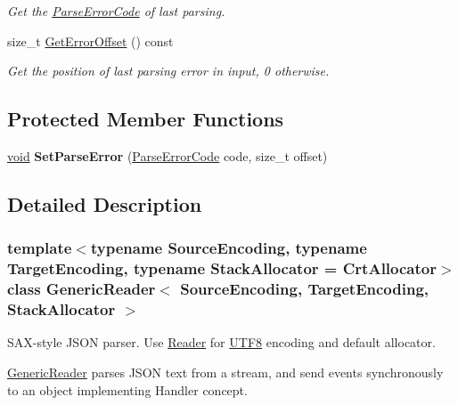 \begin{DoxyCompactItemize}
\begin{DoxyCompactList}\small\item\em Get the \hyperlink{group___r_a_p_i_d_j_s_o_n___e_r_r_o_r_s_ga8d4b32dfc45840bca189ade2bbcb6ba7}{Parse\+Error\+Code} of last parsing. \end{DoxyCompactList}\item 
\hypertarget{class_generic_reader_a77399ac40cca1fb113a2d507f476b4e7}{}size\+\_\+t \hyperlink{class_generic_reader_a77399ac40cca1fb113a2d507f476b4e7}{Get\+Error\+Offset} () const \label{class_generic_reader_a77399ac40cca1fb113a2d507f476b4e7}

\begin{DoxyCompactList}\small\item\em Get the position of last parsing error in input, 0 otherwise. \end{DoxyCompactList}\end{DoxyCompactItemize}
\subsection*{Protected Member Functions}
\begin{DoxyCompactItemize}
\item 
\hypertarget{class_generic_reader_ae50079444295bf109730c3b708a818a6}{}\hyperlink{_s_d_l__audio_8h_a52835ae37c4bb905b903cbaf5d04b05f}{void} {\bfseries Set\+Parse\+Error} (\hyperlink{group___r_a_p_i_d_j_s_o_n___e_r_r_o_r_s_ga8d4b32dfc45840bca189ade2bbcb6ba7}{Parse\+Error\+Code} code, size\+\_\+t offset)\label{class_generic_reader_ae50079444295bf109730c3b708a818a6}

\end{DoxyCompactItemize}


\subsection{Detailed Description}
\subsubsection*{template$<$typename Source\+Encoding, typename Target\+Encoding, typename Stack\+Allocator = Crt\+Allocator$>$class Generic\+Reader$<$ Source\+Encoding, Target\+Encoding, Stack\+Allocator $>$}

S\+A\+X-\/style J\+S\+O\+N parser. Use \hyperlink{reader_8h_a84f3b66a66647f4ac4267078359188ba}{Reader} for \hyperlink{struct_u_t_f8}{U\+T\+F8} encoding and default allocator. 

\hyperlink{class_generic_reader}{Generic\+Reader} parses J\+S\+O\+N text from a stream, and send events synchronously to an object implementing Handler concept.

